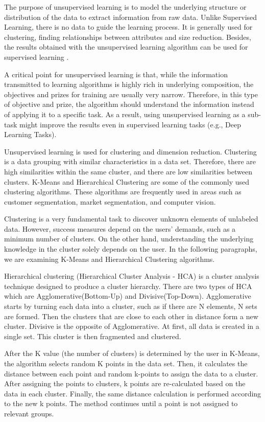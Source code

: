 The purpose of unsupervised learning is to model the underlying structure or distribution of the data to extract information from raw data. Unlike Supervised Learning, there is no data to guide the learning process. It is generally used for clustering, finding relationships between attributes and size reduction. Besides, the results obtained with the unsupervised learning algorithm can be used for supervised learning \cite{chao2011machine}.

A critical point for unsupervised learning is that, while the information transmitted to learning algorithms is highly rich in underlying composition, the objectives and prizes for training are usually very narrow. Therefore, in this type of objective and prize, the algorithm should understand the information instead of applying it to a specific task. As a result, using unsupervised learning as a sub-task might improve the results even in supervised learning tasks (e.g., Deep Learning Tasks).

Unsupervised learning is used for clustering and dimension reduction. Clustering is a data grouping with similar characteristics in a data set. Therefore, there are high similarities within the same cluster, and there are low similarities between clusters. K-Means and Hierarchical Clustering are some of the commonly used clustering algorithms. These algorithms are frequently used in areas such as customer segmentation, market segmentation, and computer vision.

Clustering is a very fundamental task to discover unknown elements of unlabeled data. However, success measures depend on the users' demands, such as a minimum number of clusters. On the other hand, understanding the underlying knowledge in the cluster solely depends on the user. In the following paragraphs, we are examining K-Means and Hierarchical Clustering algorithms.

Hierarchical clustering (Hierarchical Cluster Analysis - HCA) is a cluster analysis technique designed to produce a cluster hierarchy. There are two types of HCA which are Agglomerative(Bottom-Up) and Divisive(Top-Down). Agglomerative starts by turning each data into a cluster, such as if there are N elements, N sets are formed. Then the clusters that are close to each other in distance form a new cluster. Divisive is the opposite of Agglomerative. At first, all data is created in a single set. This cluster is then fragmented and clustered. 

After the K value (the number of clusters) is determined by the user in K-Means, the algorithm selects random K points in the data set. Then, it calculates the distance between each point and random k-points to assign the data to a cluster. After assigning the points to clusters, k points are re-calculated based on the data in each cluster. Finally, the same distance calculation is performed according to the new k points. The method continues until a point is not assigned to relevant groups.

